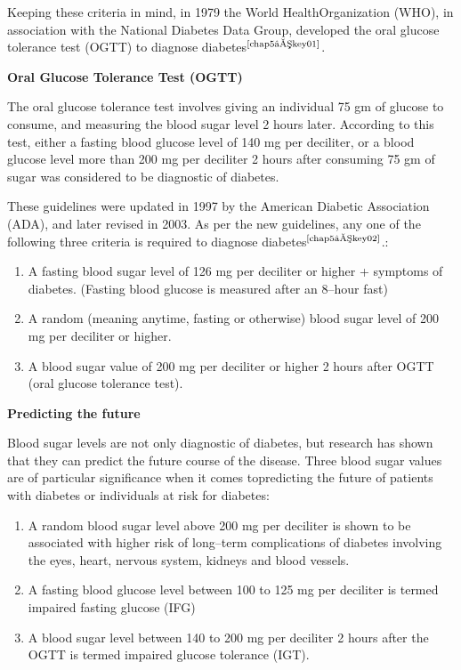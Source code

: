Keeping these criteria in mind, in 1979 the World Health\break Organi\-zation (WHO), in association with the National Diabetes Data Group, developed the oral glucose tolerance test (OGTT) to diagnose diabetes$^{\text{\cite{chap5–key01}}}$.

\noindent
\textbf{Oral Glucose Tolerance Test (OGTT)}

The oral glucose tolerance test involves giving an individual 75 gm of glucose to consume, and measuring the blood sugar level 2 hours later. According to this test, either a fasting blood glucose level of 140 mg per deciliter, or a blood glucose level more than 200 mg per deciliter 2 hours after consuming 75 gm of sugar was considered to be diagnostic of diabetes.

These guidelines were updated in 1997 by the American Diabetic Association (ADA), and later revised in 2003. As per the new guidelines, any one of the following three criteria is required to diagnose diabetes$^{\text{\cite{chap5–key02}}}$.:

\vspace{-\topsep}
\begin{enumerate}
\itemsep=0pt
\item A fasting blood sugar level of 126 mg per deciliter or higher + symptoms of diabetes. (Fasting blood glucose is measured after an 8–hour fast)
\item A random (meaning anytime, fasting or otherwise) blood sugar level of 200 mg per deciliter or higher.
\item A blood sugar value of 200 mg per deciliter or higher 2 hours after OGTT (oral glucose tolerance test).
 \end{enumerate}
 \vspace{-\topsep}

\noindent
\textbf{Predicting the future}

Blood sugar levels are not only diagnostic of diabetes, but research has shown that they can predict the future course of the disease. Three blood sugar values are of particular significance when it comes to\break predicting the future of patients with diabetes or individuals at risk for diabetes:

\begin{enumerate}
\itemsep=0pt
\item A random blood sugar level above 200 mg per deciliter is shown to be associated with higher risk of long–term complications of diabetes involving the eyes, heart, nervous system, kidneys and blood vessels.
 \item A fasting blood glucose level between 100 to 125 mg per deciliter is termed impaired fasting glucose (IFG)
 \item A blood sugar level between 140 to 200 mg per deciliter 2 hours after the OGTT is termed impaired glucose tolerance (IGT).
 \end{enumerate}
 \vspace{-\topsep}

